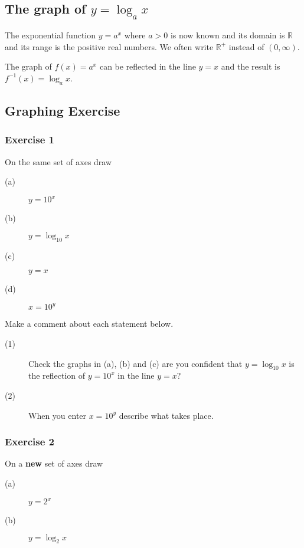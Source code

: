 \subsection{The graph of $y =\log _{a} x$}
The exponential function $y =a^{x}$ where $a >0$ is now known and its domain is $\mathbb{R}$ and its range is the positive real numbers. We often
write $\mathbb{R}^{ +}$ instead of $\left (0 ,\infty \right )$. 

The graph of $f (x) =a^{x}$ can be reflected in the line $y =x$ and the result is $f^{ -1} (x) =\log _{a} x$. 

\subsection{Graphing Exercise}


\subsubsection{Exercise 1}
On the same set of axes draw 


\begin{description}
\item [(a)] $y =10^{x}$ 

\item [(b)] $y =\log _{10} x$ 

\item [(c)] $y =x$ 

\item [(d)] $x =10^{y}$ \end{description}

Make a comment about each statement below. 

\begin{description}
\item [(1)] Check the graphs in (a), (b) and (c) are you confident that $y =\log _{10} x$ is the reflection of $y =10^{x}$ in the line $y =x$?\vspace{2cm} 

\item [(2)]
When you enter $x =10^{y}$ describe what takes place.\vspace{2cm} \end{description}

\subsubsection{Exercise 2}
On a \textbf{new} set of axes draw 


\begin{description}
\item [(a)] $y =2^{x}$ 

\item [(b)] $y =\log _{2} x$ \end{description}


